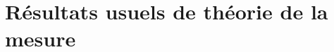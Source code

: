 \documentclass[a4paper,12pt]{article}
\newtheorem{proposition}[theorem]{Proposition}
\newtheorem{lemma}[theorem]{Lemme}
\newcommand{\ev}{\mathrm{ev}}
\newcommand{\norm}[1]{\left\Vert #1\right\Vert}
\newcommand{\indic}{\mathbbm{1}}
\newcommand{\integral}[4]{\int_{#1}^{#2} #3~\mathrm{d}#4}
\newcommand{\ssi}{si et seulement si }
\newcommand{\comp}{\circ}
\renewcommand{\implies}{\Rightarrow}
\DeclareMathOperator{\Supp}{supp}
\begin{document}
%
%
%
%
%

\newpage

\appendix

\section{Résultats usuels de théorie de la mesure}
\end{document}
